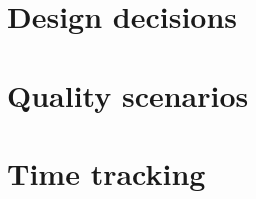 \documentclass[11pt, oneside]{book}
\begin{document}
\chapter{Design decisions}
\label{chp:design_decisions}


\chapter{Quality scenarios}
\label{chp:quality_scenarios}


\listoftodos[Notes]

\appendix

\chapter{Time tracking}
\label{chp:time_track}


\backmatter

\printbibliography
\end{document}
